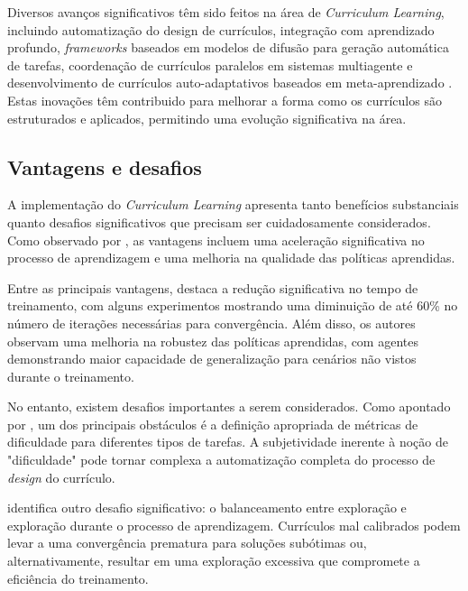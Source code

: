 Diversos avanços significativos têm sido feitos na área de \textit{Curriculum Learning}, incluindo automatização do design de currículos, integração com aprendizado profundo, \textit{frameworks} baseados em modelos de difusão para geração automática de tarefas, coordenação de currículos paralelos em sistemas multiagente e desenvolvimento de currículos auto-adaptativos baseados em meta-aprendizado \cite{curriculum_reinforcement_learning, diffusion_based_curriculum_reinforcement_learning, curriculum_learning_in_rl, variational_curriculum_rl}. Estas inovações têm contribuido para melhorar a forma como os currículos são estruturados e aplicados, permitindo uma evolução significativa na área.

\subsection{Vantagens e desafios}
\label{subsec:curriculum_vantagens_desafios}

A implementação do \textit{Curriculum Learning} apresenta tanto benefícios substanciais quanto desafios significativos que precisam ser cuidadosamente considerados. Como observado por \cite{curriculum_learning_in_rl}, as vantagens incluem uma aceleração significativa no processo de aprendizagem e uma melhoria na qualidade das políticas aprendidas.

Entre as principais vantagens, \cite{curriculum_reinforcement_learning} destaca a redução significativa no tempo de treinamento, com alguns experimentos mostrando uma diminuição de até 60\% no número de iterações necessárias para convergência. Além disso, os autores observam uma melhoria na robustez das políticas aprendidas, com agentes demonstrando maior capacidade de generalização para cenários não vistos durante o treinamento.

No entanto, existem desafios importantes a serem considerados. Como apontado por \cite{boosted_curriculum_rl}, um dos principais obstáculos é a definição apropriada de métricas de dificuldade para diferentes tipos de tarefas. A subjetividade inerente à noção de "dificuldade" pode tornar complexa a automatização completa do processo de \textit{design} do currículo.

 \cite{curriculum} identifica outro desafio significativo: o balanceamento entre exploração e exploração durante o processo de aprendizagem. Currículos mal calibrados podem levar a uma convergência prematura para soluções subótimas ou, alternativamente, resultar em uma exploração excessiva que compromete a eficiência do treinamento.

